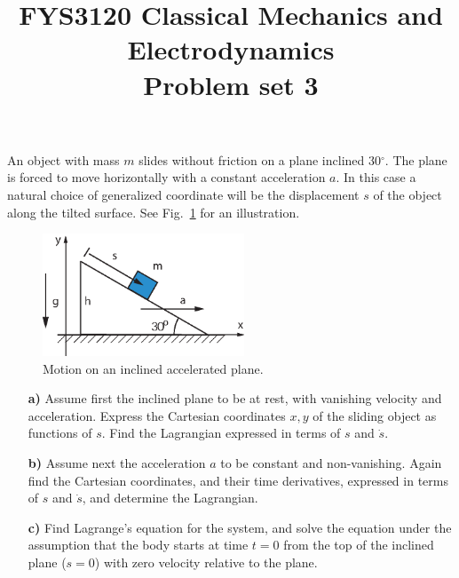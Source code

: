 \documentclass[11pt,a4paper]{report}
\title{FYS3120 Classical Mechanics and Electrodynamics\\ 
\vspace{15mm}Problem set 3}
\newcounter{excount}[chapter]
\newenvironment{exercise}[1][]{\addtocounter{excount}{1} \noindent {\bf Problem
    \arabic{excount} \ \ #1}\hspace{2mm}}{\vspace{4mm}}
\begin{document}
\maketitle


\begin{exercise}
An object with mass $m$ slides without friction on a plane inclined 30$^\circ$. The plane is forced to move horizontally with a constant acceleration $a$. In this case a natural choice of generalized coordinate will be the displacement $s$ of the object along the tilted surface. See Fig.~\ref{fig:incaccplane} for an illustration.

\begin{figure}[h]
\begin{center}
\includegraphics[width=6cm]{AkselerertSkraplan.eps}
\end{center}
\caption{Motion on an inclined accelerated plane.}
\label{fig:incaccplane}
\end{figure}

\begin{itemize}
\item[\bf a)] Assume first the inclined plane to be at rest, with vanishing velocity and acceleration. Express the Cartesian coordinates $x,y$ of the sliding object as functions of $s$. Find the Lagrangian expressed in terms of $s$ and $\dot s$.
\item[\bf b)]  Assume next the acceleration $a$ to be constant and non-vanishing. Again find the Cartesian coordinates, and their time derivatives, expressed in terms of $s$ and $\dot s$, and determine the Lagrangian.
\item[\bf c)] Find Lagrange's equation for the system, and solve the equation under the assumption that the body starts at time $t=0$ from the top of the inclined plane ($s=0$) with zero velocity relative to the plane.
\end{itemize}
\end{exercise}
\end{document}

